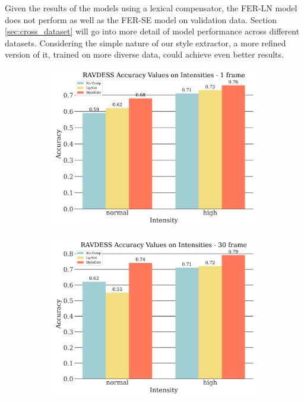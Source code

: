 Given the results of the models using a lexical compensator, the FER-LN model does not perform as well as the FER-SE model on validation data. Section \ref{sec:cross_dataset} will go into more detail of model performance across different datasets. Considering the simple nature of our style extractor, a more refined version of it, trained on more diverse data, could achieve even better results.
\begin{figure}
    \centering
    \begin{subfigure}[b]{0.45\textwidth}
      \includegraphics[width=\textwidth]{res/rd-intensities-1.png}
    \end{subfigure}
    \begin{subfigure}[b]{0.45\textwidth}
      \includegraphics[width=\textwidth]{res/rd-intensities-30.png}

\end{subfigure}
\end{figure}
